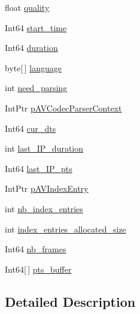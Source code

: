 \begin{DoxyCompactItemize}
\item 
float \hyperlink{struct_tao_1_1_f_fmpeg_1_1_f_fmpeg_1_1_a_v_stream_a55bdc7c79f4213ac0a8ce7afbf54eb0d}{quality}
\item 
Int64 \hyperlink{struct_tao_1_1_f_fmpeg_1_1_f_fmpeg_1_1_a_v_stream_a56e236bec851080e48eca31b83ab5078}{start\_\-time}
\item 
Int64 \hyperlink{struct_tao_1_1_f_fmpeg_1_1_f_fmpeg_1_1_a_v_stream_a8b84a21c3b456d4721ce8ff1dc6ab587}{duration}
\item 
byte\mbox{[}$\,$\mbox{]} \hyperlink{struct_tao_1_1_f_fmpeg_1_1_f_fmpeg_1_1_a_v_stream_a69802cf1e78cd90725f574d813faacec}{language}
\item 
int \hyperlink{struct_tao_1_1_f_fmpeg_1_1_f_fmpeg_1_1_a_v_stream_aa0f6a2923daec9eefb78bba3fae1832c}{need\_\-parsing}
\item 
IntPtr \hyperlink{struct_tao_1_1_f_fmpeg_1_1_f_fmpeg_1_1_a_v_stream_a153e5d7ffd55e25292f609d8cb845260}{pAVCodecParserContext}
\item 
Int64 \hyperlink{struct_tao_1_1_f_fmpeg_1_1_f_fmpeg_1_1_a_v_stream_addbf6545a4879ddc633294e90b29a0d0}{cur\_\-dts}
\item 
int \hyperlink{struct_tao_1_1_f_fmpeg_1_1_f_fmpeg_1_1_a_v_stream_a6c71354d32d76c2d258bca983c779683}{last\_\-IP\_\-duration}
\item 
Int64 \hyperlink{struct_tao_1_1_f_fmpeg_1_1_f_fmpeg_1_1_a_v_stream_ae097618c1f8178e70a3d65dba7eee3b6}{last\_\-IP\_\-pts}
\item 
IntPtr \hyperlink{struct_tao_1_1_f_fmpeg_1_1_f_fmpeg_1_1_a_v_stream_a26c1da97daf3f18b9623247f57b03a8f}{pAVIndexEntry}
\item 
int \hyperlink{struct_tao_1_1_f_fmpeg_1_1_f_fmpeg_1_1_a_v_stream_ad41294ceaaf5a8d3381b1c5f5f883430}{nb\_\-index\_\-entries}
\item 
int \hyperlink{struct_tao_1_1_f_fmpeg_1_1_f_fmpeg_1_1_a_v_stream_a3fa03add7e0877ff5494192551d25e9b}{index\_\-entries\_\-allocated\_\-size}
\item 
Int64 \hyperlink{struct_tao_1_1_f_fmpeg_1_1_f_fmpeg_1_1_a_v_stream_a327bb238cbef75a0636a3065602e9930}{nb\_\-frames}
\item 
Int64\mbox{[}$\,$\mbox{]} \hyperlink{struct_tao_1_1_f_fmpeg_1_1_f_fmpeg_1_1_a_v_stream_a713d891d0efb23fb260a6b2d4142be47}{pts\_\-buffer}
\end{DoxyCompactItemize}


\subsection{Detailed Description}


